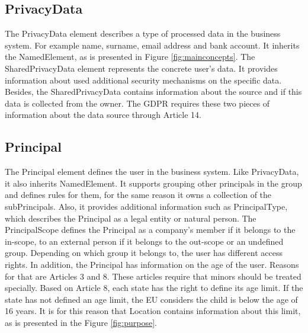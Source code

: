 \documentclass[11pt,english]{article}
\begin{document}
\subsection{PrivacyData}
The PrivacyData element describes a type of processed data in the business system. For example name, surname, email address and bank account. It inherits the NamedElement, as is presented in Figure \ref{fig:mainconcepts}. The SharedPrivacyData element represents the concrete user's data. It provides information about used additional security mechanisms on the specific data. Besides, the SharedPrivacyData contains information about the source and if this data is collected from the owner. The GDPR requires these two pieces of information about the data source through Article 14.
\subsection{Principal}
The Principal element defines the user in the business system. Like PrivacyData, it also inherits NamedElement. It supports grouping other principals in the group and defines rules for them, for the same reason it owns a collection of the subPrincipals. Also, it provides additional information such as PrincipalType, which describes the Principal as a legal entity or natural person. The PrincipalScope defines the Principal as a company's member if it belongs to the in-scope, to an external person if it belongs to the out-scope or an undefined group. Depending on which group it belongs to, the user has different access rights. In addition, the Principal has information on the age of the user. 
Reasons for that are Articles 3 and 8. These articles require that minors should be treated specially. Based on Article 8, each state has the right to define its age limit. If the state has not defined an age limit, the EU considers the child is below the age of 16 years. It is for this reason that Location contains information about this limit, as is presented in the Figure \ref{fig:purpose}.
\end{document}
